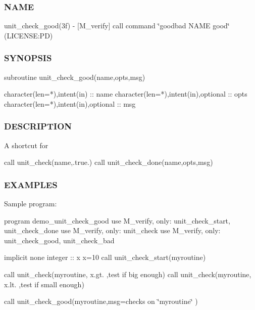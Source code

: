 \subsubsection*{N\+A\+ME}

unit\+\_\+check\+\_\+good(3f) -\/ \mbox{[}M\+\_\+verify\mbox{]} call command \char`\"{}goodbad N\+A\+M\+E good\char`\"{} (L\+I\+C\+E\+N\+SE\+:PD) 

\subsubsection*{S\+Y\+N\+O\+P\+S\+IS}

\begin{DoxyVerb}subroutine unit_check_good(name,opts,msg)

 character(len=*),intent(in)          :: name
 character(len=*),intent(in),optional :: opts
 character(len=*),intent(in),optional :: msg
\end{DoxyVerb}


\subsubsection*{D\+E\+S\+C\+R\+I\+P\+T\+I\+ON}

A shortcut for

call unit\+\_\+check(name,.true.) call unit\+\_\+check\+\_\+done(name,opts,msg)

\subsubsection*{E\+X\+A\+M\+P\+L\+ES}

Sample program\+:

program demo\+\_\+unit\+\_\+check\+\_\+good use M\+\_\+verify, only\+: unit\+\_\+check\+\_\+start, unit\+\_\+check\+\_\+done use M\+\_\+verify, only\+: unit\+\_\+check use M\+\_\+verify, only\+: unit\+\_\+check\+\_\+good, unit\+\_\+check\+\_\+bad

implicit none integer \+:\+: x x=10 call unit\+\_\+check\+\_\+start(\textquotesingle{}myroutine\textquotesingle{})

call unit\+\_\+check(\textquotesingle{}myroutine\textquotesingle{}, x.\+gt. ,\textquotesingle{}test if big enough\textquotesingle{}) call unit\+\_\+check(\textquotesingle{}myroutine\textquotesingle{}, x.\+lt. ,\textquotesingle{}test if small enough\textquotesingle{})

call unit\+\_\+check\+\_\+good(\textquotesingle{}myroutine\textquotesingle{},msg=\textquotesingle{}checks on \char`\"{}myroutine\char`\"{} \textquotesingle{})

